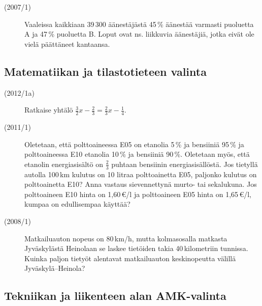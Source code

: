 \begin{description}
	\item[(2007/1)] Vaaleissa kaikkiaan 39\,300 äänestäjästä 45\,\% äänestää varmasti
        puoluetta A ja 47\,\% puoluetta B. Loput ovat ns. liikkuvia äänestäjiä,
        jotka eivät ole vielä päättäneet kantaansa.
	
    	\begin{alakohdat}
    	\end{alakohdat}	 	
	
\end{description}

\subsection*{Matematiikan ja tilastotieteen valinta}

\begin{description}
	\item[(2012/1a)] Ratkaise yhtälö $\frac{3}{2}x - \frac{2}{3} = \frac{2}{3}x - \frac{1}{4}$.
	\item[(2011/1)] Oletetaan, että polttoaineessa E05 on etanolia 5\,\% ja
        bensiiniä 95\,\% ja polttoaineessa E10 etanolia 10\,\% ja bensiiniä 90\,\%.
        Oletetaan myös, että etanolin energiasisältö on $\frac{2}{3}$ puhtaan bensiinin
		energiasisällöstä. Jos tietyllä autolla 100\,km kulutus on 10 litraa
        polttoainetta E05, paljonko kulutus on polttoainetta E10? Anna vastaus
        sievennettynä murto- tai sekalukuna. Jos polttoaineen E10 hinta on 1,60\,€/l
        ja polttoaineen E05 hinta on 1,65\,€/l, kumpaa on edullisempaa käyttää?
	\item[(2008/1)] Matkailuauton nopeus on 80\,km/h, mutta kolmasosalla matkasta
        Jyväskylästä Heinolaan se laskee tietöiden takia 40\,kilometriin tunnissa.
        Kuinka paljon tietyöt alentavat matkailuauton keskinopeutta välillä Jyväskylä--Heinola?
\end{description}

\subsection*{Tekniikan ja liikenteen alan AMK-valinta}

